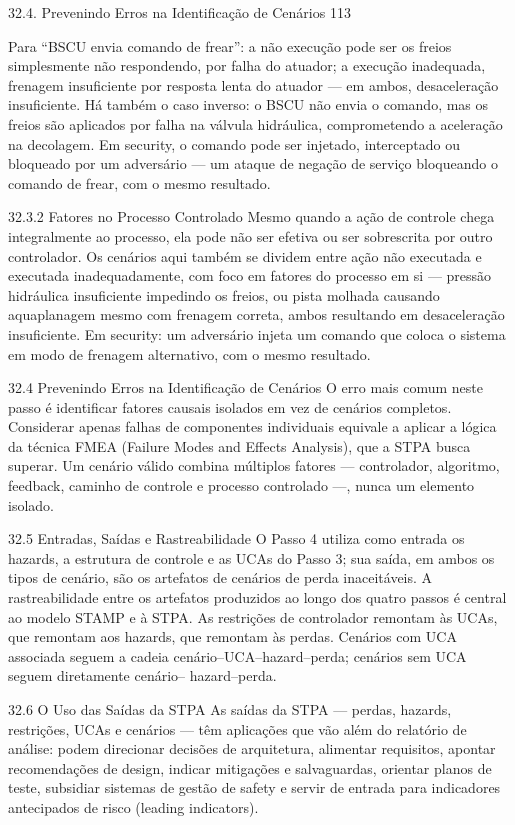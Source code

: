 32.4. Prevenindo Erros na Identificação de Cenários 113

Para “BSCU envia comando de frear”: a não execução pode ser os freios simplesmente não respondendo, por falha do atuador; a execução inadequada, frenagem insuficiente por resposta lenta do atuador — em ambos, desaceleração insuficiente. Há também o caso inverso: o BSCU não envia o comando, mas os freios são aplicados por falha na válvula hidráulica, comprometendo a aceleração na decolagem. Em security, o comando pode ser injetado, interceptado ou bloqueado por um adversário — um ataque de negação de serviço bloqueando o comando de frear, com o mesmo resultado.

32.3.2 Fatores no Processo Controlado Mesmo quando a ação de controle chega integralmente ao processo, ela pode não ser efetiva ou ser sobrescrita por outro controlador. Os cenários aqui também se dividem entre ação não executada e executada inadequadamente, com foco em fatores do processo em si — pressão hidráulica insuficiente impedindo os freios, ou pista molhada causando aquaplanagem mesmo com frenagem correta, ambos resultando em desaceleração insuficiente. Em security: um adversário injeta um comando que coloca o sistema em modo de frenagem alternativo, com o mesmo resultado.

32.4 Prevenindo Erros na Identificação de Cenários O erro mais comum neste passo é identificar fatores causais isolados em vez de cenários completos. Considerar apenas falhas de componentes individuais equivale a aplicar a lógica da técnica FMEA (Failure Modes and Effects Analysis), que a STPA busca superar. Um cenário válido combina múltiplos fatores — controlador, algoritmo, feedback, caminho de controle e processo controlado —, nunca um elemento isolado.

32.5 Entradas, Saídas e Rastreabilidade O Passo 4 utiliza como entrada os hazards, a estrutura de controle e as UCAs do Passo 3; sua saída, em ambos os tipos de cenário, são os artefatos de cenários de perda inaceitáveis. A rastreabilidade entre os artefatos produzidos ao longo dos quatro passos é central ao modelo STAMP e à STPA. As restrições de controlador remontam às UCAs, que remontam aos hazards, que remontam às perdas. Cenários com UCA associada seguem a cadeia cenário–UCA–hazard–perda; cenários sem UCA seguem diretamente cenário– hazard–perda.

32.6 O Uso das Saídas da STPA As saídas da STPA — perdas, hazards, restrições, UCAs e cenários — têm aplicações que vão além do relatório de análise: podem direcionar decisões de arquitetura, alimentar requisitos, apontar recomendações de design, indicar mitigações e salvaguardas, orientar planos de teste, subsidiar sistemas de gestão de safety e servir de entrada para indicadores antecipados de risco (leading indicators).

